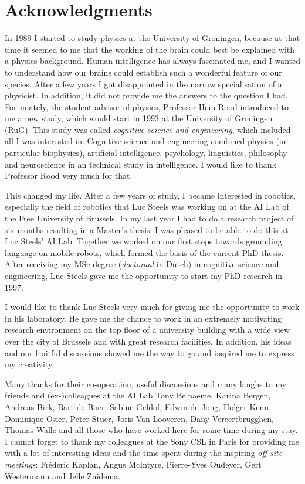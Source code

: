 \chapter*{Acknowledgments}

In 1989 I started to study physics at the University of Groningen, because at that time it seemed to me that the working of the brain could best be explained with a physics background. Human intelligence has always fascinated me, and I wanted to understand how our brains could establish such a wonderful feature of our species. After a few years I got disappointed in the narrow specialisation of a physicist. In addition, it did not provide me the answers to the question I had. Fortunately, the student advisor of physics, Professor Hein Rood introduced to me a new study, which would start in 1993 at the University of Groningen (RuG). This study was called {\em cognitive science and engineering}, which included all I was interested in. Cognitive science and engineering combined physics (in particular biophysics), artificial intelligence, psychology, linguistics, philosophy and neuroscience in an technical study in intelligence. I would like to thank Professor Rood very much for that.

This changed my life. After a few years of study, I became interested in robotics, especially the field of robotics that Luc Steels was working on at the AI Lab of the Free University of Brussels. In my last year I had to do a research project of six months resulting in a Master's thesis. I was pleased to be able to do this at Luc Steels' AI Lab. Together we worked on our first steps towards grounding language on mobile robots, which formed the basis of the current PhD thesis. After receiving my MSc degree ({\em doctoraal} in Dutch) in cognitive science and engineering, Luc Steels gave me the opportunity to start my PhD research in 1997.

I would like to thank Luc Steels very much for giving me the opportunity to work in his laboratory. He gave me the chance to work in an extremely motivating research environment on the top floor of a university building with a wide view over the city of Brussels and with great research facilities. In addition, his ideas and our fruitful discussions showed me the way to go and inspired me to express my creativity.

Many thanks for their co-operation, useful discussions and many laughs to my friends and (ex-)colleagues at the AI Lab Tony Belpaeme, Karina Bergen, Andreas Birk, Bart de Boer, Sabine Geldof, Edwin de Jong, Holger Kenn, Dominique Osier, Peter Stuer, Joris Van Looveren, Dany Vereertbrugghen, Thomas Walle and all those who have worked here for some time during my stay. I cannot forget to thank my colleagues at the Sony CSL in Paris for providing me with a lot of interesting ideas and the time spent during the inspiring {\em off-site meetings}: Fr\'ed\'eric Kaplan, Angus McIntyre, Pierre-Yves Oudeyer, Gert Westermann and Jelle Zuidema.

